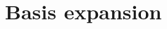 \documentclass[CS5104-Notes.tex]{subfiles}
\begin{document}
\section{Basis expansion}
\end{document}
